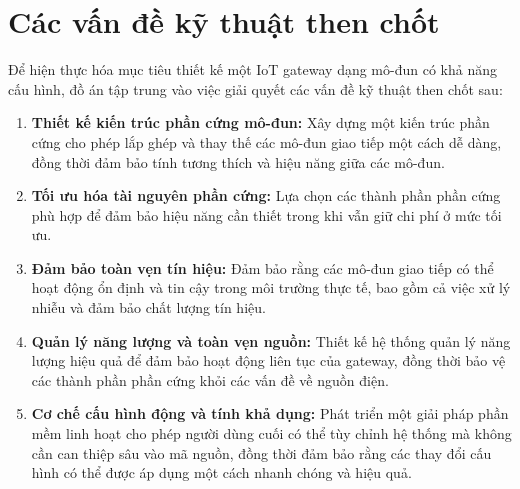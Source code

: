 \section{Các vấn đề kỹ thuật then chốt}\label{sec:cac_van_de}
    Để hiện thực hóa mục tiêu thiết kế một IoT gateway dạng mô-đun có khả năng cấu hình, đồ án tập trung vào việc giải quyết các vấn đề kỹ thuật then chốt sau:
    \begin{enumerate}
        \item \textbf{Thiết kế kiến trúc phần cứng mô-đun:} Xây dựng một kiến trúc phần cứng cho phép lắp ghép và thay thế các mô-đun giao tiếp một cách dễ dàng, đồng thời đảm bảo tính tương thích và hiệu năng giữa các mô-đun.
        \item \textbf{Tối ưu hóa tài nguyên phần cứng:} Lựa chọn các thành phần phần cứng phù hợp để đảm bảo hiệu năng cần thiết trong khi vẫn giữ chi phí ở mức tối ưu.
        \item \textbf{Đảm bảo toàn vẹn tín hiệu:} Đảm bảo rằng các mô-đun giao tiếp có thể hoạt động ổn định và tin cậy trong môi trường thực tế, bao gồm cả việc xử lý nhiễu và đảm bảo chất lượng tín hiệu.
        \item \textbf{Quản lý năng lượng và toàn vẹn nguồn:} Thiết kế hệ thống quản lý năng lượng hiệu quả để đảm bảo hoạt động liên tục của gateway, đồng thời bảo vệ các thành phần phần cứng khỏi các vấn đề về nguồn điện.
        \item \textbf{Cơ chế cấu hình động và tính khả dụng:} Phát triển một giải pháp phần mềm linh hoạt cho phép người dùng cuối có thể tùy chỉnh hệ thống mà không cần can thiệp sâu vào mã nguồn, đồng thời đảm bảo rằng các thay đổi cấu hình có thể được áp dụng một cách nhanh chóng và hiệu quả.   
    \end{enumerate}

